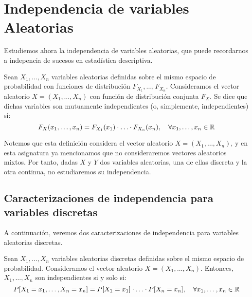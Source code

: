 \chapter{Independencia de variables Aleatorias}

Estudiemos ahora la independencia de variables aleatorias, que puede recordarnos a indepencia de sucesos en estadística descriptiva.
\begin{definicion}
    Sean $X_1, \ldots, X_n$ variables aleatorias definidas sobre el mismo espacio de probabilidad con funciones de distribución $F_{X_1}, \ldots, F_{X_n}$. Consideramos el vector aleatorio $X=(X_1,\dots,X_n)$ con función de distribución conjunta $F_X$. Se dice que dichas variables son mutuamente independientes (o, simplemente, independientes) si:
    \[
        F_X(x_1, \ldots, x_n) = F_{X_1}(x_1) \cdot \ldots \cdot F_{X_n}(x_n), \quad \forall x_1, \ldots, x_n \in \mathbb{R}
    \]
\end{definicion}
\begin{observacion}
    Notemos que esta definición considera el vector aleatorio $X=(X_1,\dots,X_n)$, y en esta asignatura ya mencionamos que no consideraremos vectores aleatorios mixtos. Por tanto, dadas $X$ y $Y$ dos variables aleatorias, una de ellas discreta y la otra continua, no estudiaremos su independencia.
\end{observacion}


\section{Caracterizaciones de independencia para variables discretas}

A continuación, veremos dos caracterizaciones de independencia para variables aleatorias discretas.
\begin{prop}
    Sean $X_1, \ldots, X_n$ variables aleatorias discretas definidas sobre el mismo espacio de probabilidad. Consideramos el vector aleatorio $X=(X_1,\dots,X_n)$. Entonces, $X_1, \ldots, X_n$ son independientes si y solo si:
    \[
        P[X_1 = x_1, \ldots, X_n = x_n] = P[X_1 = x_1] \cdot \ldots \cdot P[X_n = x_n], \quad \forall x_1, \ldots, x_n \in \mathbb{R}
    \]
\end{prop}

